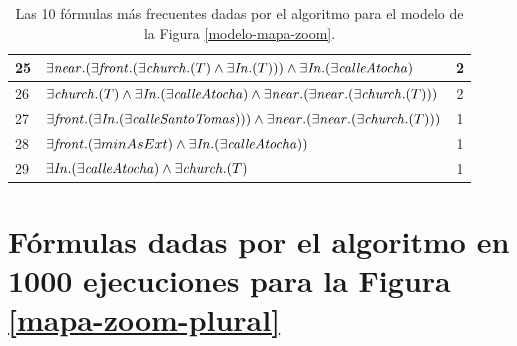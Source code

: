 \begin{table}[H]
\begin{center}
\begin{tabular}{|l|l|c|}
25&$\exists  \mathit{near}.(\exists \mathit{front}.(\exists \mathit{church}.(T) \land \exists \mathit{In} .(T))) \land \exists \mathit{In} .(\exists \mathit{calleAtocha})$ &2\\ \hline

26&$\exists \mathit{church}.(T) \land \exists \mathit{In} .(\exists \mathit{calleAtocha}) \land \exists \mathit{near}.(\exists \mathit{near}.(\exists \mathit{church}.(T)))$ &2\\ \hline

27&$\exists \mathit{front}.(\exists \mathit{In} .(\exists \mathit{calleSantoTomas}))) \land \exists \mathit{near}.(\exists \mathit{near}.(\exists \mathit{church}.(T)))$ &1\\ \hline

28&$\exists \mathit{front} . (\exists minAsExt) \land \exists \mathit{In} .(\exists \mathit{calleAtocha}))$ &1\\ \hline

29&$\exists  \mathit{In} .(\exists \mathit{calleAtocha}) \land \exists \mathit{church}.(T)$ &1\\ \hline

\end{tabular}

\caption{Las 10 f\'ormulas m\'as frecuentes dadas por el algoritmo para el modelo de la Figura \protect\ref{modelo-mapa-zoom}.}\label{formulas-mapa-zoom-ap}
\end{center}
\end{table}

\section{F\'ormulas dadas por el algoritmo en 1000 ejecuciones para la Figura \ref{mapa-zoom-plural}}


